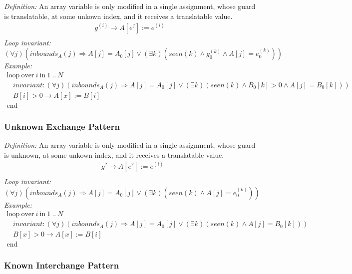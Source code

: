 \documentclass[a4paper,10pt]{article}
\newcommand{\idx}{\ensuremath{i}\xspace}
\newcommand{\at}[1]{{(#1)}}
\newcommand{\KWloop}{\ensuremath{\mathrm{loop}~}}
\newcommand{\KWend}{\ensuremath{\mathrm{end}~}}
\newcommand{\KWover}{\ensuremath{\mathrm{over}~}}
\newcommand{\KWin}{\ensuremath{~\mathrm{in}~}}
\newcommand{\impl}{\ensuremath{\Longrightarrow}}
\newcommand{\inbounds}[2]{\ensuremath{\mathit{inbounds}_{#1}(#2)}\xspace}
\newcommand{\seen}[1]{\ensuremath{\mathit{seen}(#1)}\xspace}
\newcommand{\loopinvariant}{\noindent\textit{Loop invariant:}\xspace}
\newcommand{\patterndef}{\noindent\textit{Definition:}\xspace}
\newcommand{\patternexample}{\noindent\textit{Example:}\xspace}
\begin{document}
\patterndef An array variable is only modified in a single assignment,
whose guard is translatable, at some unkown index, and it receives a translatable value.
%
\begin{eqnarray*}
g^\at{\idx} \rightarrow A[e^?] := e^\at{\idx}\\
\end{eqnarray*}
%
\loopinvariant
%
$$(\forall j)(\inbounds{A}{j} \impl A[j] = A_0[j] \lor (\exists k)(\seen{k} \land g_0^\at{k} \land A[j] = e_0^\at{k}))$$
%
\patternexample
$$\begin{array}{l}
  \KWloop \KWover i \KWin 1~..~N \\
  ~~~~ \textit{invariant}: (\forall j)(\inbounds{A}{j} \impl A[j] = A_0[j] \lor (\exists k)(\seen{k} \land B_0[k] > 0 \land A[j] = B_0[k]))\\
  ~~~~ B[i] > 0 \rightarrow A[x] := B[i]\\
  \KWend
\end{array}$$

\subsubsection*{Unknown Exchange Pattern}

\patterndef An array variable is only modified in a single assignment,
whose guard is unknown, at some unkown index, and it receives a translatable value.
%
\begin{eqnarray*}
&g^? \rightarrow A[e^?] := e^\at{\idx}\\
\end{eqnarray*}
%
\loopinvariant
%
$$(\forall j)(\inbounds{A}{j} \impl A[j] = A_0[j] \lor (\exists k)(\seen{k} \land A[j] = e_0^\at{k}))$$
%
\patternexample
$$\begin{array}{l}
  \KWloop \KWover i \KWin 1~..~N \\
  ~~~~ \textit{invariant}: (\forall j)(\inbounds{A}{j} \impl A[j] = A_0[j] \lor (\exists k)(\seen{k} \land A[j] = B_0[k]))\\
  ~~~~ B[x] > 0 \rightarrow A[x] := B[i]\\
  \KWend
\end{array}$$

\subsubsection*{Known Interchange Pattern}
\end{document}
